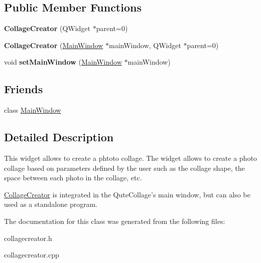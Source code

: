 \subsection*{Public Member Functions}
\begin{DoxyCompactItemize}
\item 
\hypertarget{class_collage_creator_a0b238ad59b58be98725267e25404037f}{
{\bfseries CollageCreator} (QWidget $\ast$parent=0)}
\label{class_collage_creator_a0b238ad59b58be98725267e25404037f}

\item 
\hypertarget{class_collage_creator_a620747082ee751776cf84ac690f4c221}{
{\bfseries CollageCreator} (\hyperlink{class_main_window}{MainWindow} $\ast$mainWindow, QWidget $\ast$parent=0)}
\label{class_collage_creator_a620747082ee751776cf84ac690f4c221}

\item 
\hypertarget{class_collage_creator_afa43b65209fb0f7f209d936ddc3eb4f8}{
void {\bfseries setMainWindow} (\hyperlink{class_main_window}{MainWindow} $\ast$mainWindow)}
\label{class_collage_creator_afa43b65209fb0f7f209d936ddc3eb4f8}

\end{DoxyCompactItemize}
\subsection*{Friends}
\begin{DoxyCompactItemize}
\item 
\hypertarget{class_collage_creator_af9db4b672c4d3104f5541893e08e1809}{
class \hyperlink{class_collage_creator_af9db4b672c4d3104f5541893e08e1809}{MainWindow}}
\label{class_collage_creator_af9db4b672c4d3104f5541893e08e1809}

\end{DoxyCompactItemize}


\subsection{Detailed Description}
This widget allows to create a phtoto collage. The widget allows to create a photo collage based on parameters defined by the user such as the collage shape, the space between each photo in the collage, etc.

\hyperlink{class_collage_creator}{CollageCreator} is integrated in the QuteCollage's main window, but can also be used as a standalone program. 

The documentation for this class was generated from the following files:\begin{DoxyCompactItemize}
\item 
collagecreator.h\item 
collagecreator.cpp\end{DoxyCompactItemize}
